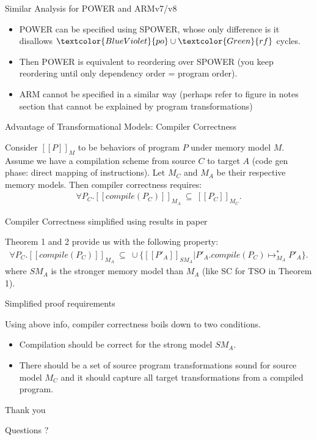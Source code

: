 \documentclass[xcolor={dvipsnames}, notes]{beamer}
\newcommand{\po}{\textcolor{BlueViolet}{po}}
\newcommand{\rf}{\textcolor{Green}{rf}}
\begin{document}
    \begin{frame}{Similar Analysis for POWER and ARMv7/v8}
        
        \begin{itemize}
            \item POWER can be specified using SPOWER, whose only difference is it disallows $\po \cup \rf$ cycles.
            \item Then POWER is equivalent to reordering over SPOWER (you keep reordering until only dependency order = program order).
            \item ARM cannot be specified in a similar way (perhaps refer to figure in notes section that cannot be explained by program transformations)
        \end{itemize}
        
    \end{frame}

    \begin{frame}{Advantage of Transformational Models: Compiler Correctness}

        Consider $[[P]]_{M}$ to be behaviors of program $P$ under memory model $M$. 
        Assume we have a compilation scheme from source $C$ to target $A$ (code gen phase: direct mapping of instructions).
        Let $M_{C}$ and $M_{A}$ be their respective memory models.
        Then compiler correctness requires: 
        \begin{align*}
            \forall P_{C}.[[compile(P_{C})]]_{M_{A}} \ \subseteq \ [[P_{C}]]_{M_{C}}. 
        \end{align*}  

    \end{frame}

    \begin{frame}{Compiler Correctness simplified using results in paper}

        Theorem 1 and 2 provide us with the following property:
        \begin{align*}
            \forall P_{C}.[[compile(P_{C})]]_{M_{A}} \ 
                \subseteq \ 
            \cup \{[[P'_{A}]]_{SM_{A}} | P'_{A}. compile(P_{C}) \longmapsto^{*}_{M_{A}} P'_{A} \}.  
        \end{align*}  
        where $SM_{A}$ is the stronger memory model than $M_{A}$ (like SC for TSO in Theorem 1).

    \end{frame}

    \begin{frame}{Simplified proof requirements}

        Using above info, compiler correctness boils down to two conditions. 
        \begin{itemize}
            \item Compilation should be correct for the strong model $SM_{A}$.
            \item There should be a set of source program transformations sound for source model $M_{C}$ and it should capture all target transformations from a compiled program. 
        \end{itemize}

    \end{frame}

    \begin{frame}{Thank you}

        Questions ?

    \end{frame}
\end{document}
